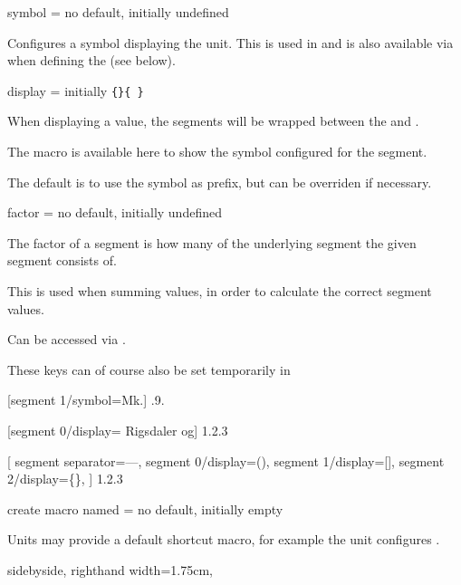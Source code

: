 \documentclass{article}
\begin{document}
\begin{docKey}
	[segment 0]{symbol}
	{=}
	{no default, initially undefined}

	Configures a symbol displaying the unit. This is used in  and is also available via  when defining the  (see below).
\end{docKey}

\begin{docKey}
	[segment 0]
	{display}
	{=}
	{initially \texttt{\{\}\{ \}}}

	When displaying a value, the segments will be wrapped between the  and .
	
	The macro  is available here to show the symbol configured for the segment.
	
	The default is to use the symbol as prefix, but can be overriden if necessary.
\end{docKey}

\begin{docKey}
	[segment 0]
	{factor}
	{=}
	{no default, initially undefined}
	
	The factor of a segment is how many of the underlying segment the given segment consists of.
	
	This is used when summing values, in order to calculate the correct segment values.
	
	Can be accessed via .
\end{docKey}

These keys can of course also be set temporarily in 

\begin{dispExample}
	[segment 1/symbol=Mk.]
	{.9.}

	[segment 0/display={}{ Rigsdaler og}]
	{1.2.3}

[
		segment separator={---},
		segment 0/display={(}{)},
		segment 1/display={[}{]},
		segment 2/display={\{}{\}},
	]
	{1.2.3}
\end{dispExample}

\begin{docKey}
	{create macro named}
	{=}
	{no default, initially empty}
	
	Units may provide a default shortcut macro, for example the  unit configures .

\begin{dispExample*}{
	sidebyside,
	righthand width=1.75cm,
}
\end{dispExample*}
\end{docKey}
\end{document}
